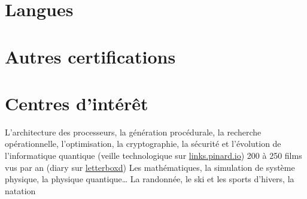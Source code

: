 \documentclass[a4paper,10pt,sans]{moderncv}
\renewcommand{\deletedSpace}{0mm}
\begin{document}

    \vspace*{\deletedSpace}
    \printbibliography[title=Publications]{}
    \vspace*{-2mm}


    \vspace*{\deletedSpace}
    \section{Langues}


    \vspace*{\deletedSpace}
    \section{Autres certifications}


    \vspace*{\deletedSpace}
    \section{Centres d'intérêt}
            {L'architecture des processeurs, la génération procédurale, la recherche opérationnelle, l'optimisation, la cryptographie, la sécurité et l'évolution de l'informatique quantique (veille technologique sur \href{http://links.pinard.io}{links.pinard.io})}
            {200 à 250 films vus par an (diary sur \href{https://letterboxd.com/pinam45/diary/}{letterboxd})}
            {Les mathématiques, la simulation de système physique, la physique quantique\ldots}
            {La randonnée, le ski et les sports d'hivers, la natation}
\end{document}
